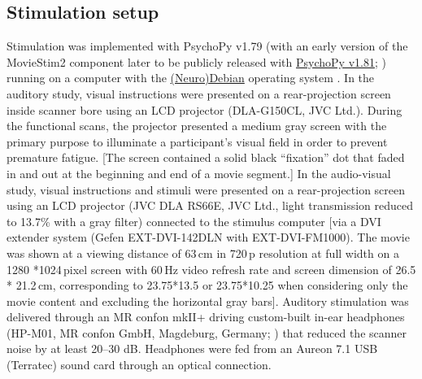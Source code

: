 \documentclass[english]{article}
\begin{document}
\subsection{Stimulation setup}
Stimulation was implemented with PsychoPy v1.79 (with an early version of the MovieStim2 component later to be publicly released with \href{http://www.psychopy.org}{PsychoPy v1.81}; \citep{peirce2007psychopy}) running on a computer with the \href{http://neuro.debian.net}{(Neuro)Debian} operating system \citep{halchenko2012open}.
In the auditory study, visual instructions were presented on a rear-projection screen inside scanner bore using an LCD projector (DLA-G150CL, JVC Ltd.).
During the functional scans, the projector presented a medium gray screen with the primary purpose to illuminate a participant’s visual field in order to prevent premature fatigue.
[The screen contained a solid black ``fixation'' dot that faded in and out at the beginning and end of a movie segment.]
In the audio-visual study, visual instructions and stimuli were presented on a rear-projection screen using an LCD projector (JVC DLA RS66E, JVC Ltd., light transmission reduced to 13.7\% with a gray filter) connected to the stimulus computer [via a DVI extender system (Gefen EXT-DVI-142DLN with EXT-DVI-FM1000).
The movie was shown at a viewing distance of 63\,cm in 720\,p resolution at full width on a 1280 *1024\,pixel screen with 60\,Hz video refresh rate and screen dimension of 26.5 * 21.2\,cm, corresponding to 23.75*13.5 or 23.75*10.25 when considering only the movie content and excluding the horizontal gray bars].
Auditory stimulation was delivered through an MR confon mkII+ driving custom-built in-ear headphones (HP-M01, MR confon GmbH, Magdeburg, Germany; \citep{baumgart1998electrodynamic}) that reduced the scanner noise by at least 20–30 dB. Headphones were  fed from an Aureon 7.1 USB (Terratec) sound card through an optical connection.
\end{document}
